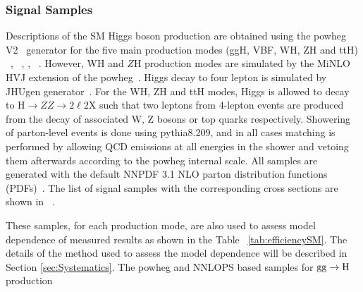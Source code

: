 \subsubsection{Signal Samples}
Descriptions of the SM Higgs boson production are obtained using the 
{\sc powheg V2}~\cite{Alioli:2008gx,Nason:2004rx,Frixione:2007vw} generator for the five main production modes (ggH, VBF, WH, ZH and ttH) 
~\cite{Bagnaschi:2011tu}, ~\cite{Nason:2009ai}, \cite{Hartanto:2015uka}, ~\cite{Luisoni:2013kna}.
However, WH and $Z$H production modes are simulated by the {\sc MiNLO HVJ} extension of the {\sc powheg}~\cite{Luisoni:2013kna}. 
Higgs decay to four lepton is simulated by {\sc JHUgen} generator~\cite{Gao:2010qx}. For the WH, ZH and ttH modes, Higgs is allowed
to decay to H$\to ZZ \to 2\ell2$X such that two leptons from 4-lepton events are produced from 
the decay of associated W, Z bosons or top quarks respectively. 
Showering of parton-level events is done using {\sc pythia8.209}, and in all cases matching is performed by  
allowing QCD emissions at all energies in the shower and vetoing them afterwards according to the 
{\sc powheg} internal scale. All samples are generated with the default NNPDF 3.1 NLO parton distribution 
functions (PDFs)~\cite{Ball:2014uwa}. The list of signal samples with the corresponding cross sections are shown in ~\cite{CMS:2019chr}.  
\par These samples, for each production mode, are also used to assess model dependence of measured results as shown in the Table ~\ref{tab:efficiencySM}. The details of the method used to assess the model dependence will be
described in Section \ref{sec:Systematics}.
The {\sc powheg} and {\sc NNLOPS} based samples for ${\rm gg}\rightarrow{\rm H}$ production %
